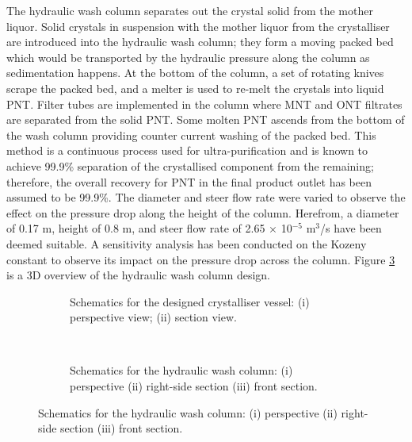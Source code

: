 The hydraulic wash column separates out the crystal solid from the mother liquor. Solid crystals in suspension with the mother liquor from the crystalliser are introduced into the hydraulic wash column; they form a moving packed bed which would be transported by the hydraulic pressure along the column as sedimentation happens. At the bottom of the column, a set of rotating knives scrape the packed bed, and a melter is used to re-melt the crystals into liquid PNT. Filter tubes are implemented in the column where MNT and ONT filtrates are separated from the solid PNT. Some molten PNT ascends from the bottom of the wash column providing counter current washing of the packed bed. This method is a continuous process used for ultra-purification and is known to achieve 99.9\% separation of the crystallised component from the remaining; therefore, the overall recovery for PNT in the final product outlet has been assumed to be 99.9\%. The diameter and steer flow rate were varied to observe the effect on the pressure drop along the height of the column. Herefrom, a diameter of 0.17 m, height of 0.8 m, and steer flow rate of 2.65 $\times$ 10$^{-5}$ m$^{3}$/s have been deemed suitable. A sensitivity analysis has been conducted on the Kozeny constant to observe its impact on the pressure drop across the column. Figure \ref{fig:wash column schematic executive} is a 3D overview of the hydraulic wash column design.


\begin{figure}[h]
    \centering
    \begin{subfigure}[h]{0.5\textwidth}
    \centering
    
    \caption{Schematics for the designed crystalliser vessel: (i) perspective view; (ii) section view.}
    \label{fig:crystalliser schematic executive}
    \end{subfigure}%
    ~ 
    \begin{subfigure}[h]{0.5\textwidth}
    \centering
    
    \caption{Schematics for the hydraulic wash column: (i) perspective (ii) right-side section (iii) front section.}
    \label{fig:wash column schematic executive}
    \end{subfigure}
\end{figure}
